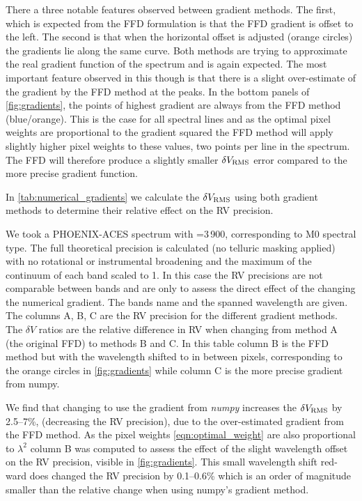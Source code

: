 There a three notable features observed between gradient methods.
The first, which is expected from the {FFD} formulation is that the {FFD} gradient is offset to the left.
The second is that when the horizontal offset is adjusted (orange circles) the gradients lie along the same curve.
Both methods are trying to approximate the real gradient function of the spectrum and is again expected.
The most important feature observed in this though is that there is a slight over-estimate of the gradient by the {FFD} method at the peaks.
In the bottom panels of \cref{fig:gradients}, the points of highest gradient are always from the {FFD} method (blue/orange).
This is the case for all spectral lines and as the optimal pixel weights are proportional to the gradient squared the {FFD} method will apply slightly higher pixel weights to these values, two points per line in the spectrum.
The {FFD} will therefore produce a slightly smaller \(\delta V_{\textrm{RMS}}\) error compared to the more precise gradient function.

In \cref{tab:numerical_gradients} we calculate the  \(\delta V_{\textrm{RMS}}\) using both gradient methods to determine their relative effect on the {RV} precision.

We took a {PHOENIX-ACES} spectrum with \Teff{}=3\,900\K{}, corresponding to {{M0}} spectral type.
The full theoretical precision is calculated (no telluric masking applied) with no rotational or instrumental broadening and the maximum of the continuum of each band scaled to 1.
In this case the {RV} precisions are not comparable between bands and are only to assess the direct effect of the changing the numerical gradient.
The bands name and the spanned wavelength are given.
The columns A, B, C are the {RV} precision for the different gradient methods.
The \(\delta V\) ratios are the relative difference in {RV} when changing from method A (the original {FFD}) to methods B and C.
In this table column B is the {FFD} method but with the wavelength shifted to in between pixels, corresponding to the orange circles in \cref{fig:gradients} while column C is the more precise gradient from numpy.

We find that changing to use the gradient from \emph{numpy} increases the \(\delta V_{\textrm{RMS}}\) by 2.5--7\%, (decreasing the {RV} precision), due to the over-estimated gradient from the {FFD} method.
As the pixel weights \cref{eqn:optimal_weight} are also proportional to \({\lambda}^{2}\) column B was computed to assess the effect of the slight wavelength offset on the {RV} precision, visible in \cref{fig:gradients}.
This small wavelength shift red-ward does changed the {RV} precision by 0.1--0.6\% which is an order of magnitude smaller than the relative change when using numpy's gradient method.

